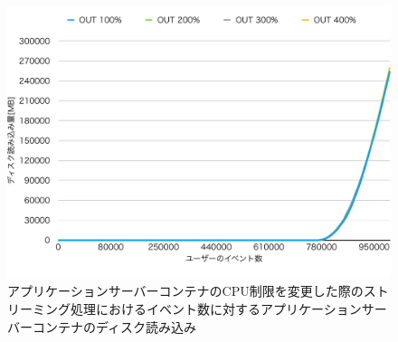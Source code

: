 \documentclass[../../../../../main]{subfiles}
\begin{document}
    \begin{figure}[H]
        \centering
        \includegraphics[width=12cm]{graph}
        \caption{アプリケーションサーバーコンテナのCPU制限を変更した際のストリーミング処理におけるイベント数に対するアプリケーションサーバーコンテナのディスク読み込み}
        \label{fig:stream-change-cpu-limit-app-disk-out-app_1024-db_1_1024}
    \end{figure}
\end{document}

